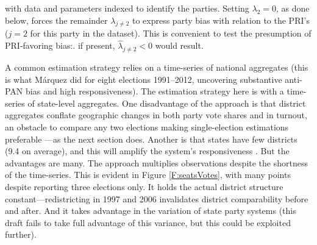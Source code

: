 \documentclass[letter,12pt]{article}
\begin{document}
\noindent with data and parameters indexed to identify the parties. \citep[Another, with application to Argentine federalism, is][.]{calvo.micozzi.govReform.2005} Setting $\lambda_2 = 0$, as done below, forces the remainder $\lambda_{j \neq 2}$ to express party bias with relation to the PRI's ($j=2$ for this party in the dataset). This is convenient to test the presumption of PRI-favoring bias:. if present, $\hat{\lambda}_{j \neq 2}<0$ would result.

A common estimation strategy relies on a time-series of national aggregates (this is what M\'arquez did for eight elections 1991--2012, uncovering substantive anti-PAN bias and high responsiveness). The estimation strategy here is with a time-series of state-level aggregates. One disadvantage of the approach is that district aggregates conflate geographic changes in both party vote shares and in turnout, an obstacle to compare any two elections making single-election estimations preferable \citet{niemi.fett1986swing,linzerSeatVoteElasticity2012}---as the next section does. Another is that states have few districts (9.4 on average), and this will amplify the system's responsiveness \citep{taagepera.CubeLaw.1973}. But the advantages are many. The approach multiplies observations despite the shortness of the time-series. This is evident in Figure \ref{F:seatsVotes}, with many points despite reporting three elections only. It holds the actual district structure constant---redistricting in 1997 and 2006 invalidates district comparability before and after. And it takes advantage in the variation of state party systems (this draft fails to take full advantage of this variance, but this could be exploited further). 

 
\end{document}
